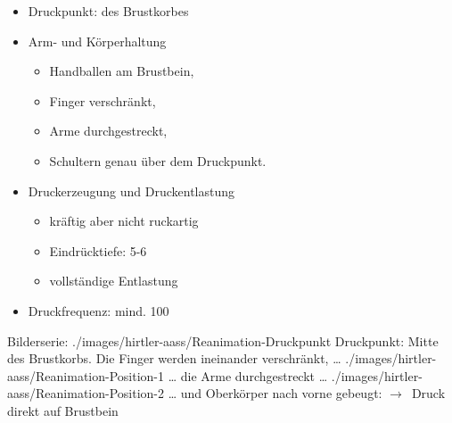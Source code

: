 {}{
\begin{itemize}
  \item Druckpunkt:  des Brustkorbes
  \item Arm- und Körperhaltung
  \begin{itemize}
    \item Handballen am Brustbein,
    \item Finger verschränkt,
    \item Arme durchgestreckt,
    \item Schultern genau über dem Druckpunkt.
  \end{itemize}
  \item Druckerzeugung und Druckentlastung
  \begin{itemize}
    \item kräftig aber nicht ruckartig
    \item Eindrücktiefe: 5-6\CM*
    \item vollständige Entlastung
  \end{itemize}
  \item Druckfrequenz: mind. 100\PerMin*
\end{itemize}
}{}{}{}

\begin{PictureSeriesWide}{}{Bilderserie:  \label{fig:hdm}}
{./images/hirtler-aass/Reanimation-Druckpunkt}
{Druckpunkt: Mitte des Brustkorbs. Die Finger werden
ineinander verschränkt, \ldots}
{./images/hirtler-aass/Reanimation-Position-1}
{{\ldots} die Arme durchgestreckt \ldots}
{./images/hirtler-aass/Reanimation-Position-2}
{{\ldots} und Oberkörper nach vorne gebeugt:
$\rightarrow$~Druck direkt auf Brustbein}
{}
{}
\end{PictureSeriesWide}


\begin{Synopsis}
\end{Synopsis}


